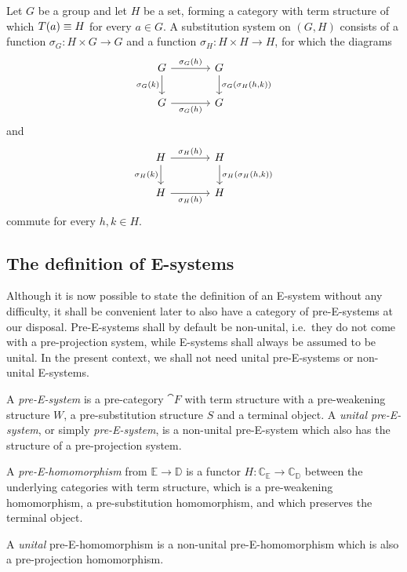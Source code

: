 \begin{eg}
Let $G$ be a group and let $H$ be a set, forming a category with term 
structure of which $T(a)\equiv H$ for every $a\in G$. A substitution
system on $(G,H)$ consists of a function $\sigma_G : H\times G\to G$ and
a function $\sigma_H:H\times H\to H$, for which the diagrams
\begin{equation*}
\begin{tikzcd}[column sep=large]
G \arrow[r,"\sigma_G(h)"]
  \arrow[d,swap,"\sigma_G(k)"]
  &
G \arrow[d,"{\sigma_G(\sigma_H(h,k))}"]
  \\
G \arrow[r,swap,"\sigma_G(h)"] 
& G
\end{tikzcd}
\end{equation*}
and
\begin{equation*}
\begin{tikzcd}[column sep=large]
H \arrow[r,"\sigma_H(h)"]
  \arrow[d,swap,"\sigma_H(k)"]
  &
H \arrow[d,"{\sigma_H(\sigma_H(h,k))}"]
  \\
H \arrow[r,swap,"\sigma_H(h)"]
  &
H
\end{tikzcd}
\end{equation*}
commute for every $h,k\in H$. 
\end{eg}

\subsection{The definition of E-systems}

Although it is now possible to state the definition of an E-system without
any difficulty, it shall be convenient later to also have a category of
pre-E-systems at our disposal. Pre-E-systems shall by default be non-unital,
i.e.~they do not come with a pre-projection system, while E-systems shall
always be assumed to be unital. In the present context, we shall not need
unital pre-E-systems or non-unital E-systems.

\begin{defn}
A \emph{pre-E-system} is a pre-category $\cat{F}$ with term structure
with a pre-weakening structure $W$, a pre-substitution structure $S$ and a terminal
object. A \emph{unital pre-E-system}, or simply \emph{pre-E-system}, is a non-unital pre-E-system
which also has the structure of a pre-projection system. 
\end{defn}

\begin{defn}
A \emph{pre-E-homomorphism} from $\mathbb{E}\to\mathbb{D}$ is a functor
$H:\mathbb{C}_\mathbb{E}\to\mathbb{C}_\mathbb{D}$ between the underlying categories
with term structure, which is a pre-weakening homomorphism, a pre-substitution
homomorphism, and which preserves the terminal object. 

A \emph{unital} pre-E-homomorphism is a non-unital pre-E-homomorphism which is 
also a pre-projection homomorphism. 
\end{defn}

